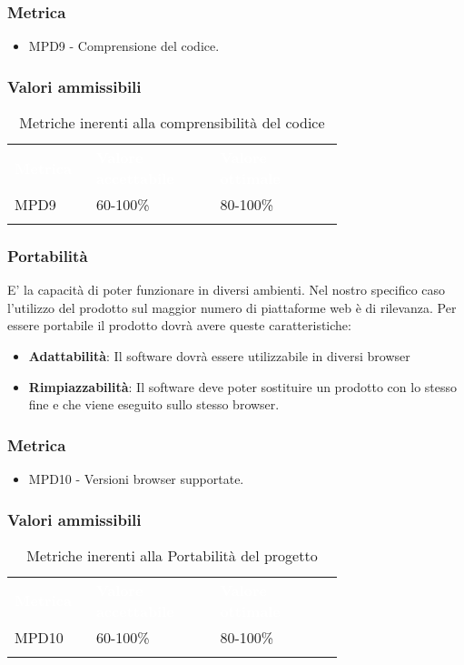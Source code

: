 \subsubsection{Metrica}
\begin{itemize}
    \item MPD9 - Comprensione del codice.
\end{itemize}
\subsubsection{Valori ammissibili}
\renewcommand{\arraystretch}{1.5}
\begin{longtable}{p{0.12\linewidth}p{0.30\linewidth}p{0.30\linewidth}}
	\rowcolor[RGB]{33, 73, 50}
	\textcolor{white}{\textbf{Metrica}} & \textcolor{white}{\textbf{Valore accettabile}} & \textcolor{white}{\textbf{Valore ottimale}}\\
    \rowcolor[RGB]{233, 245, 206}
    MPD9 & 60-100\% & 80-100\%\\ 
    \caption{Metriche inerenti alla comprensibilità del codice}
\end{longtable}	
\subsubsection{Portabilità}
E' la capacità di poter funzionare in diversi ambienti. Nel nostro specifico caso l'utilizzo del
prodotto sul maggior numero di piattaforme web è di rilevanza.
Per essere portabile il prodotto dovrà avere queste caratteristiche:
\begin{itemize}
    \item \textbf{Adattabilità}: Il software dovrà essere utilizzabile in diversi browser
    \item \textbf{Rimpiazzabilità}: Il software deve poter sostituire un prodotto con lo stesso fine e che viene eseguito sullo stesso browser.
\end{itemize}
\subsubsection{Metrica}
\begin{itemize}
    \item MPD10 - Versioni browser supportate.
\end{itemize}
\subsubsection{Valori ammissibili}
\renewcommand{\arraystretch}{1.5}
\begin{longtable}{p{0.12\linewidth}p{0.30\linewidth}p{0.30\linewidth}}
	\rowcolor[RGB]{33, 73, 50}
	\textcolor{white}{\textbf{Metrica}} & \textcolor{white}{\textbf{Valore accettabile}} & \textcolor{white}{\textbf{Valore ottimale}}\\
    \rowcolor[RGB]{233, 245, 206}
    MPD10 & 60-100\% & 80-100\%\\ 
    \caption{Metriche inerenti alla Portabilità del progetto}
\end{longtable}	
